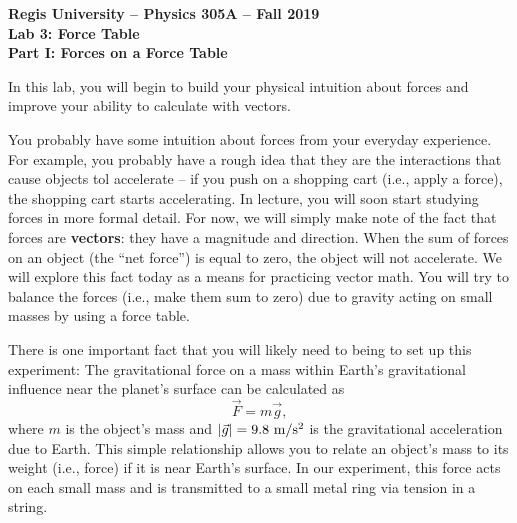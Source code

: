 \documentclass[11pt]{article}
\begin{document}
\begin{center}
{\bf{Regis University -- Physics 305A -- Fall 2019}} \\
{\bf{Lab 3: Force Table}} \\
\medskip
\textbf{Part I: Forces on a Force Table}
\end{center}

\medskip

In this lab, you will begin to build your physical intuition about forces and 
improve your ability to calculate with vectors.

You probably have some intuition about forces from your everyday experience. For example, you probably have a rough idea that they are the interactions that cause objects tol accelerate -- if you push on a shopping cart (i.e., apply a force), the shopping cart starts accelerating. In lecture, you will soon start studying forces in more formal detail. For now, we will simply make note of the fact that forces are \textbf{vectors}: they have a magnitude and direction. When the sum of forces on an object (the ``net force'') is equal to zero, the object will not accelerate. We will explore this fact today as a means for practicing vector math. You will try to balance the forces (i.e., make them sum to zero) due to gravity acting on small masses by using a force table.

There is one important fact that you will likely need to being to set up this experiment: The gravitational force on a mass within Earth's gravitational influence near the planet's surface can be calculated as 
\begin{equation}
\vec{F}=m\vec{g},
\end{equation}
where $m$ is the object's mass and $|\vec{g}|=9.8~\rm m/s^2$ is the gravitational acceleration due to Earth. This simple relationship allows you to relate an object's mass to its weight (i.e., force) if it is near Earth's surface. In our experiment, this force acts on each small mass and is transmitted to a small metal ring via tension in a string.

\bigskip
\end{document}
